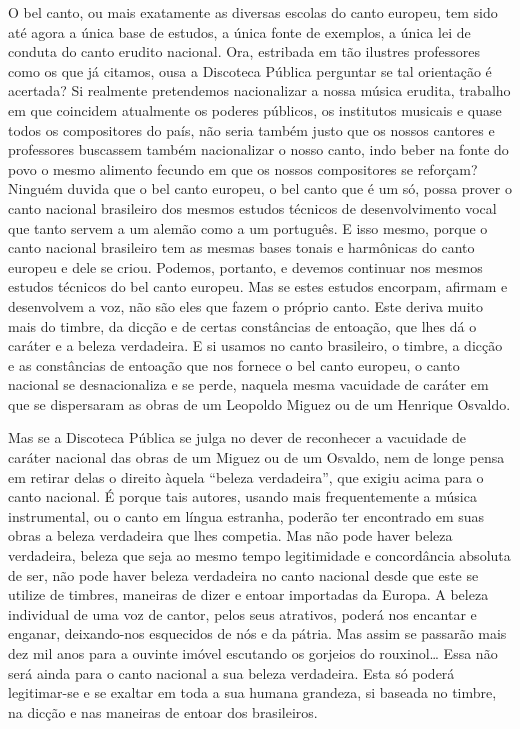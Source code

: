 O bel canto, ou mais exatamente as diversas escolas do canto europeu,
tem sido até agora a única base de estudos, a única fonte de exemplos, a
única lei de conduta do canto erudito nacional. Ora, estribada em tão
ilustres professores como os que já citamos, ousa a Discoteca Pública
perguntar se tal orientação é acertada? Si realmente pretendemos
nacionalizar a nossa música erudita, trabalho em que coincidem
atualmente os poderes públicos, os institutos musicais e quase todos os
compositores do país, não seria também justo que os nossos cantores e
professores buscassem também nacionalizar o nosso canto, indo beber na
fonte do povo o mesmo alimento fecundo em que os nossos compositores se
reforçam? Ninguém duvida que o bel canto europeu, o bel canto que é um
só, possa prover o canto nacional brasileiro dos mesmos estudos técnicos
de desenvolvimento vocal que tanto servem a um alemão como a um
português. E isso mesmo, porque o canto nacional brasileiro tem as
mesmas bases tonais e harmônicas do canto europeu e dele se criou.
Podemos, portanto, e devemos continuar nos mesmos estudos técnicos do
bel canto europeu. Mas se estes estudos encorpam, afirmam e desenvolvem
a voz, não são eles que fazem o próprio canto. Este deriva muito mais do
timbre, da dicção e de certas constâncias de entoação, que lhes dá o
caráter e a beleza verdadeira. E si usamos no canto brasileiro, o
timbre, a dicção e as constâncias de entoação que nos fornece o bel
canto europeu, o canto nacional se desnacionaliza e se perde, naquela
mesma vacuidade de caráter em que se dispersaram as obras de um Leopoldo
Miguez ou de um Henrique Osvaldo.

Mas se a Discoteca Pública se julga no dever de reconhecer a vacuidade
de caráter nacional das obras de um Miguez ou de um Osvaldo, nem de
longe pensa em retirar delas o direito àquela ``beleza verdadeira'', que
exigiu acima para o canto nacional. É porque tais autores, usando mais
frequentemente a música instrumental, ou o canto em língua estranha,
poderão ter encontrado em suas obras a beleza verdadeira que lhes
competia. Mas não pode haver beleza verdadeira, beleza que seja ao mesmo
tempo legitimidade e concordância absoluta de ser, não pode haver beleza
verdadeira no canto nacional desde que este se utilize de timbres,
maneiras de dizer e entoar importadas da Europa. A beleza individual de
uma voz de cantor, pelos seus atrativos, poderá nos encantar e enganar,
deixando-nos esquecidos de nós e da pátria. Mas assim se passarão mais
dez mil anos para a ouvinte imóvel escutando os gorjeios do rouxinol\ldots{}
Essa não será ainda para o canto nacional a sua beleza verdadeira. Esta
só poderá legitimar-se e se exaltar em toda a sua humana grandeza, si
baseada no timbre, na dicção e nas maneiras de entoar dos brasileiros.

